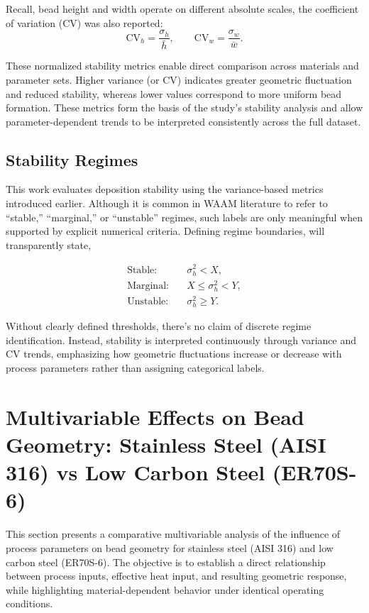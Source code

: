 \documentclass[conference]{IEEEtran}
\begin{document}
Recall, bead height and width operate on different absolute scales, the coefficient of variation (CV) was also reported:
\begin{equation}
\mathrm{CV}_h = \frac{\sigma_h}{\bar{h}},
\qquad
\mathrm{CV}_w = \frac{\sigma_w}{\bar{w}}.
\end{equation}

These normalized stability metrics enable direct comparison across materials and parameter sets. Higher variance (or CV) indicates greater geometric fluctuation and reduced stability, whereas lower values correspond to more uniform bead formation. These metrics form the basis of the study’s stability analysis and allow parameter-dependent trends to be interpreted consistently across the full dataset.

\subsection{Stability Regimes}

This work evaluates deposition stability using the variance-based metrics introduced earlier. 
Although it is common in WAAM literature to refer to “stable,” “marginal,” or “unstable” regimes, such labels are only meaningful when supported by explicit numerical criteria. 
Defining regime boundaries, will transparently state,

\begin{align}
\text{Stable:} &\quad \sigma_h^2 < X, \\
\text{Marginal:} &\quad X \leq \sigma_h^2 < Y, \\
\text{Unstable:} &\quad \sigma_h^2 \geq Y.
\end{align}

Without clearly defined thresholds, there's no claim of discrete regime identification. 
Instead, stability is interpreted continuously through variance and CV trends, emphasizing how geometric fluctuations increase or decrease with process parameters rather than assigning categorical labels.





\section{Multivariable Effects on Bead Geometry: Stainless Steel (AISI 316) vs Low Carbon Steel (ER70S-6)}

This section presents a comparative multivariable analysis of the influence of process parameters on bead geometry for stainless steel (AISI 316) and low carbon steel (ER70S-6). The objective is to establish a direct relationship between process inputs, effective heat input, and resulting geometric response, while highlighting material-dependent behavior under identical operating conditions.
\end{document}
